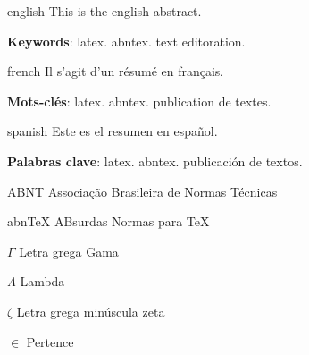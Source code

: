 \begin{resumo}[Abstract]
\begin{otherlanguage*}{english}
This is the english abstract.

\vspace{\onelineskip}

\noindent
\textbf{Keywords}: latex. abntex. text editoration.
\end{otherlanguage*}
\end{resumo}

\begin{resumo}[Résumé]
\begin{otherlanguage*}{french}
    Il s'agit d'un résumé en français.

\textbf{Mots-clés}: latex. abntex. publication de textes.
\end{otherlanguage*}
\end{resumo}

\begin{resumo}[Resumen]
\begin{otherlanguage*}{spanish}
Este es el resumen en español.

\textbf{Palabras clave}: latex. abntex. publicación de textos.
\end{otherlanguage*}
\end{resumo}

\listoffigures*
\cleardoublepage

\listofquadros*
\cleardoublepage

\listoftables*
\cleardoublepage

\begin{siglas}
  \item[ABNT] Associação Brasileira de Normas Técnicas
  \item[abnTeX] ABsurdas Normas para TeX
\end{siglas}

\begin{simbolos}
  \item[$ \Gamma $] Letra grega Gama
  \item[$ \Lambda $] Lambda
  \item[$ \zeta $] Letra grega minúscula zeta
  \item[$ \in $] Pertence
\end{simbolos}

\tableofcontents*
\cleardoublepage
